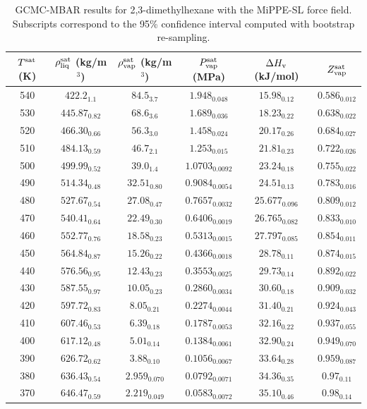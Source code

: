 \documentclass[journal=jctc,manuscript=article]{achemso}
\begin{document}
\begin{table}[htb!]
	\caption{GCMC-MBAR results for 2,3-dimethylhexane with the MiPPE-SL force field. Subscripts correspond to the 95\% confidence interval computed with bootstrap re-sampling.}
	\begin{center}
		\begin{tabular}{|c|c|c|c|c|c|}
			\hline
			$T^{\rm sat}$ (K) & $\rho_{\rm liq}^{\rm sat}$ (kg/m$^3$) & $\rho_{\rm vap}^{\rm sat}$ (kg/m$^3$) & $P_{\rm vap}^{\rm sat}$ (MPa) & $\Delta H_{\rm v}$ (kJ/mol) & $Z_{\rm vap}^{\rm sat}$ \\ \hline
			540 & $422.2_{1.1}$ & $84.5_{3.7}$ & $1.948_{0.048}$ & $15.98_{0.12}$ & $0.586_{0.012}$ \\
			530 & $445.87_{0.82}$ & $68.6_{3.6}$ & $1.689_{0.036}$ & $18.23_{0.22}$ & $0.638_{0.022}$ \\
			520 & $466.30_{0.66}$ & $56.3_{3.0}$ & $1.458_{0.024}$ & $20.17_{0.26}$ & $0.684_{0.027}$ \\
			510 & $484.13_{0.59}$ & $46.7_{2.1}$ & $1.253_{0.015}$ & $21.81_{0.23}$ & $0.722_{0.026}$ \\
			500 & $499.99_{0.52}$ & $39.0_{1.4}$ & $1.0703_{0.0092}$ & $23.24_{0.18}$ & $0.755_{0.022}$ \\
			490 & $514.34_{0.48}$ & $32.51_{0.80}$ & $0.9084_{0.0054}$ & $24.51_{0.13}$ & $0.783_{0.016}$ \\
			480 & $527.67_{0.54}$ & $27.08_{0.47}$ & $0.7657_{0.0032}$ & $25.677_{0.096}$ & $0.809_{0.012}$ \\
			470 & $540.41_{0.64}$ & $22.49_{0.30}$ & $0.6406_{0.0019}$ & $26.765_{0.082}$ & $0.833_{0.010}$ \\
			460 & $552.77_{0.76}$ & $18.58_{0.23}$ & $0.5313_{0.0015}$ & $27.797_{0.085}$ & $0.854_{0.011}$ \\
			450 & $564.84_{0.87}$ & $15.26_{0.22}$ & $0.4366_{0.0018}$ & $28.78_{0.11}$ & $0.874_{0.015}$ \\
			440 & $576.56_{0.95}$ & $12.43_{0.23}$ & $0.3553_{0.0025}$ & $29.73_{0.14}$ & $0.892_{0.022}$ \\
			430 & $587.55_{0.97}$ & $10.05_{0.23}$ & $0.2860_{0.0034}$ & $30.60_{0.18}$ & $0.909_{0.032}$ \\
			420 & $597.72_{0.83}$ & $8.05_{0.21}$ & $0.2274_{0.0044}$ & $31.40_{0.21}$ & $0.924_{0.043}$ \\
			410 & $607.46_{0.53}$ & $6.39_{0.18}$ & $0.1787_{0.0053}$ & $32.16_{0.22}$ & $0.937_{0.055}$ \\
			400 & $617.12_{0.48}$ & $5.01_{0.14}$ & $0.1384_{0.0061}$ & $32.90_{0.24}$ & $0.949_{0.070}$ \\
			390 & $626.72_{0.62}$ & $3.88_{0.10}$ & $0.1056_{0.0067}$ & $33.64_{0.28}$ & $0.959_{0.087}$ \\
			380 & $636.43_{0.54}$ & $2.959_{0.070}$ & $0.0792_{0.0071}$ & $34.36_{0.35}$ & $0.97_{0.11}$ \\
			370 & $646.47_{0.59}$ & $2.219_{0.049}$ & $0.0583_{0.0072}$ & $35.10_{0.46}$ & $0.98_{0.14}$ \\
			\hline
		\end{tabular}
	\end{center}
\end{table}
\end{document}
